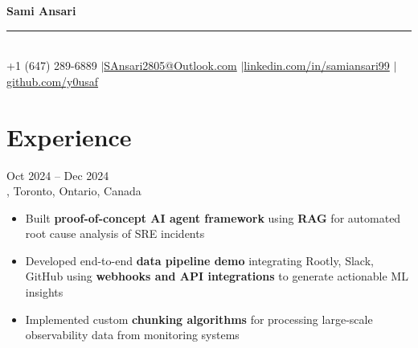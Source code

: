 \documentclass[letterpaper,10pt]{article}
\begin{document}
\begin{center}
{\LARGE\bfseries Sami Ansari} \\
\vspace{1pt}
{\rule{0.3\textwidth}{0.5pt}} \\
\vspace{4pt}
\small +1 (647) 289-6889 \enspace$|$\enspace \href{mailto:SAnsari2805@Outlook.com}{SAnsari2805@Outlook.com} \enspace$|$\enspace \href{https://linkedin.com/in/samiansari99/}{linkedin.com/in/samiansari99} \enspace$|$\enspace \href{https://github.com/y0usaf}{github.com/y0usaf}
\end{center}
\vspace{-4pt}

\section{Experience}

\hspace{0.15in}{\large\bfseries AI Engineer (Contract)} \hfill {\small Oct 2024 -- Dec 2024} \\
\hspace{0.15in}{\bfseries Rootly}, Toronto, Ontario, Canada
\vspace{-1pt}
\begin{itemize}[leftmargin=0.35in, itemsep=-1pt, topsep=1pt, labelsep=0.035in]
\item Built \textbf{proof-of-concept AI agent framework} using \textbf{RAG} for automated root cause analysis of SRE incidents
\item Developed end-to-end \textbf{data pipeline demo} integrating Rootly, Slack, GitHub using \textbf{webhooks and API integrations} to generate actionable ML insights
\item Implemented custom \textbf{chunking algorithms} for processing large-scale observability data from monitoring systems
\end{itemize}
\vspace{1pt}
\end{document}
